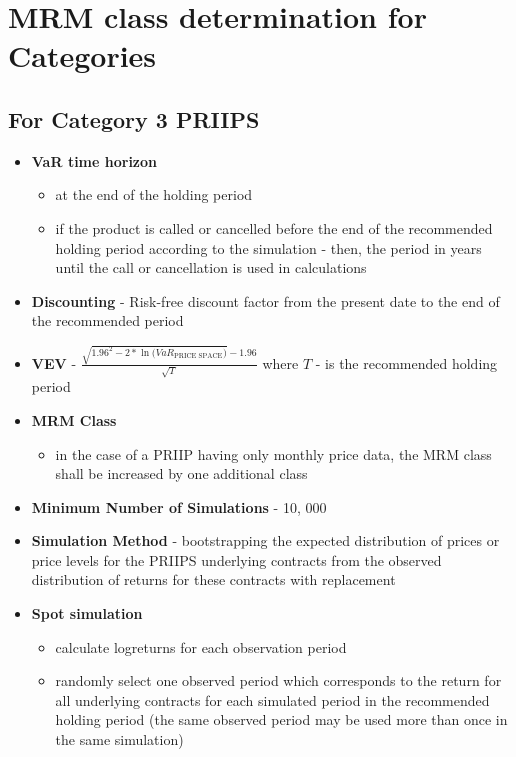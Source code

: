 \documentclass{report}
\begin{document}
\section{MRM class determination for Categories}

\subsection{For Category 3 PRIIPS}

\begin{itemize}
	\item \textbf{VaR time horizon}
	\begin{itemize}
		\item at the end of the holding period
		\item if the product is
		called or cancelled before the end of the recommended holding period according to the simulation - then, the period in years until the call or cancellation is used in calculations
	\end{itemize}
	\item \textbf{Discounting} - Risk-free discount factor from the present date to the end of the recommended period
	\item \textbf{VEV} - $\frac{\sqrt{1.96^{2} - 2 * \ln{\Big(VaR_{\text{PRICE SPACE}}\Big)}} - 1.96}{\sqrt{T}}$ where $T$ - is the recommended holding period
	\item \textbf{MRM Class}
	\begin{itemize}
		\item in the case of a PRIIP having only monthly price data, the MRM class shall be increased by one additional class 
	\end{itemize}
	\item \textbf{Minimum Number of Simulations} - 10, 000
	\item \textbf{Simulation Method} - bootstrapping the expected distribution of prices or price levels for the PRIIPS underlying contracts from the observed distribution of returns for these contracts with replacement
	\item \textbf{Spot simulation}
	\begin{itemize}
			\item calculate logreturns for each observation period
			\item randomly select one observed period which corresponds to the return for all underlying contracts for each simulated period in the recommended holding period (the same observed period may be used more than once in the same simulation)

\end{itemize}
\end{itemize}
\end{document}
